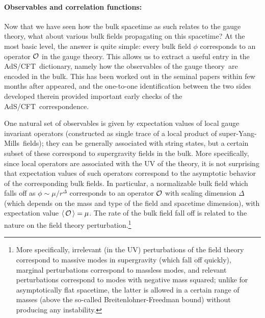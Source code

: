 \documentclass[12pt]{article}
\def\AC{AdS/CFT}
\def\GT{gauge theory}
\def\SYM{super-Yang-Mills}
\def\vev#1{\langle\, #1 \, \rangle}
\begin{document}
\paragraph{Observables and correlation functions:}  %
Now that we have seen how the bulk spacetime as such relates to the  \GT, what about various bulk fields propagating on this spacetime?
At the most basic level, the answer is quite simple: every bulk field $\phi$ corresponds to an operator ${\cal O}$ in the \GT.
This allows us to extract a useful entry in the \AC\ dictionary, namely how the observables of the \GT\ are encoded in the bulk.  
This has been worked out in the seminal papers  \cite{Gubser:1998bc,Witten:1998qj} within few months after \cite{Maldacena:1997re} appeared, and the one-to-one identification between the two sides developed therein
provided important early checks of the \AC\ correspondence.

One natural set of observables is given by expectation values of local gauge invariant operators (constructed as single trace of a local product of \SYM\ fields); they can be generally associated with string states, but a certain subset of these correspond to supergravity fields in the bulk.  More specifically, since local operators are associated with the UV of the theory, it is not surprising that expectation values of such operators correspond to the asymptotic behavior of the corresponding bulk fields.  In particular, a normalizable bulk field which falls off as $\phi \sim \mu/r^\Delta$ corresponds to an operator ${\cal O}$ with scaling dimension
$\Delta$ (which depends on the mass and type of the field and spacetime dimension), with expectation value $\vev{{\cal O}} = \mu$.
The rate of the bulk field fall off is related to the nature on the field theory perturbation.\footnote{
More specifically, irrelevant (in the UV) perturbations of the field theory correspond to massive modes in supergravity (which fall off quickly), marginal perturbations correspond to massless modes, and relevant perturbations correspond to modes with negative mass squared; unlike for asymptotically flat spacetime, the latter is allowed in a certain range of masses (above the so-called Breitenlohner-Freedman bound) \cite{Breitenlohner:1982bm,Breitenlohner:1982jf} without producing any instability.}
\end{document}
